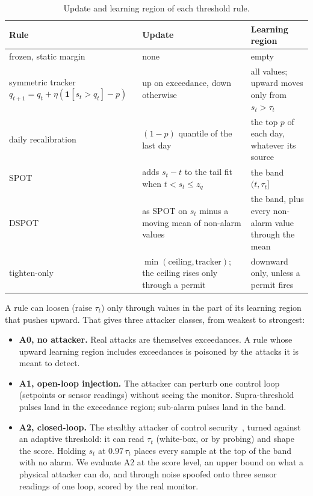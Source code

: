 \documentclass[letterpaper,twocolumn,10pt]{article}
\begin{document}
\begin{table}[t]
\caption{Update and learning region of each threshold rule.}
\label{tab:regions}
\begin{tabularx}{\textwidth}{@{}>{\hsize}L>{\hsize}L>{\hsize}L@{}}
\toprule
Rule & Update & Learning region \\
\midrule
frozen, static margin & none & empty \\
symmetric tracker $q_{t+1} = q_t + \eta(\mathbf{1}[s_t > q_t] - p)$ & up on exceedance, down otherwise & all values; upward moves only from $s_t > \tau_t$ \\
daily recalibration & $(1 - p)$ quantile of the last day & the top $p$ of each day, whatever its source \\
SPOT & adds $s_t - t$ to the tail fit when $t < s_t \le z_q$ & the band $(t, \tau_t]$ \\
DSPOT & as SPOT on $s_t$ minus a moving mean of non-alarm values & the band, plus every non-alarm value through the mean \\
tighten-only & $\min(\text{ceiling}, \text{tracker})$; the ceiling rises only through a permit & downward only, unless a permit fires \\
\bottomrule
\end{tabularx}
\end{table}

A rule can loosen (raise $\tau_t$) only through values in the part of its learning region that
pushes upward. That gives three attacker classes, from weakest to strongest:

\begin{itemize}
\item \textbf{A0, no attacker.} Real attacks are themselves exceedances. A rule whose upward
  learning region includes exceedances is poisoned by the attacks it is meant to detect.
\item \textbf{A1, open-loop injection.} The attacker can perturb one control loop (setpoints or
  sensor readings) without seeing the monitor. Supra-threshold pulses land in the exceedance
  region; sub-alarm pulses land in the band.
\item \textbf{A2, closed-loop.} The stealthy attacker of control
  security~\cite{cardenas2011process, urbina2016stealthy}, turned against an adaptive threshold: it can
  read $\tau_t$ (white-box, or by probing) and shape the score. Holding $s_t$ at $0.97\,\tau_t$ places
  every sample at the top of the band with no
  alarm. We evaluate A2 at the score level, an upper bound on what a physical attacker can do, and
  through noise spoofed onto three sensor readings of one loop, scored by the real monitor.
\end{itemize}
\end{document}
